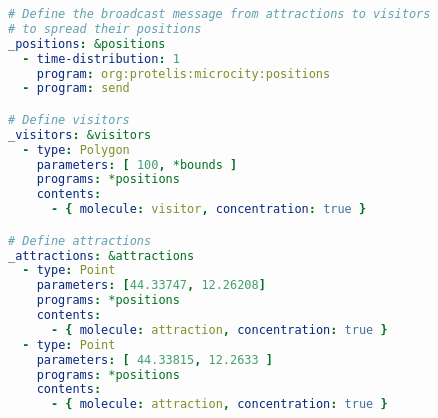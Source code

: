 \begin{lstlisting}[language=yaml, label={lst:positions}, caption=Assign the \texttt{positions} behaviour to 100 visitors and 2 attractions.]
# Define the broadcast message from attractions to visitors
# to spread their positions
_positions: &positions
  - time-distribution: 1
    program: org:protelis:microcity:positions
  - program: send

# Define visitors
_visitors: &visitors
  - type: Polygon
    parameters: [ 100, *bounds ]
    programs: *positions
    contents:
      - { molecule: visitor, concentration: true }

# Define attractions
_attractions: &attractions
  - type: Point
    parameters: [44.33747, 12.26208]
    programs: *positions
    contents:
      - { molecule: attraction, concentration: true }
  - type: Point
    parameters: [ 44.33815, 12.2633 ]
    programs: *positions
    contents:
      - { molecule: attraction, concentration: true }
\end{lstlisting}
